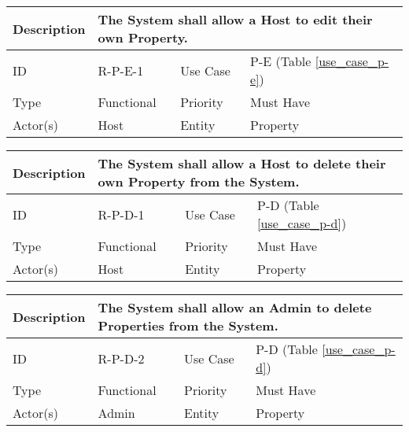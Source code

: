 \begin{tabular}{|p{1.5cm}|p{1.5cm}|p{1.5cm}|p{1.5cm}|p{1.5cm}|p{1.5cm}|p{1.5cm}|p{1.5cm}|p{1.5cm}|p{1.5cm}|p{1.5cm}|p{1.5cm}|}
    \hline
    \multicolumn{2}{|o|}{Description} & \multicolumn{10}{p{12.5cm}|}{The System shall allow a Host to edit their own Property.} \\ \hline
    \multicolumn{2}{|o|}{ID}          & \multicolumn{4}{n}{R-P-E-1}            & \multicolumn{2}{|o|}{Use Case}    & \multicolumn{4}{n|}{P-E (Table \ref{use_case_p-e})} \\ \hline
    \multicolumn{2}{|o|}{Type}        & \multicolumn{4}{n}{Functional}         & \multicolumn{2}{|o|}{Priority}    & \multicolumn{4}{n|}{Must Have}  \\ \hline
    \multicolumn{2}{|o|}{Actor(s)}    & \multicolumn{4}{n}{Host}               & \multicolumn{2}{|o|}{Entity}      & \multicolumn{4}{n|}{Property} \\ \hline
\end{tabular}

\begin{tabular}{|p{1.5cm}|p{1.5cm}|p{1.5cm}|p{1.5cm}|p{1.5cm}|p{1.5cm}|p{1.5cm}|p{1.5cm}|p{1.5cm}|p{1.5cm}|p{1.5cm}|p{1.5cm}|}
    \hline
    \multicolumn{2}{|o|}{Description} & \multicolumn{10}{p{12.5cm}|}{The System shall allow a Host to delete their own Property from the System.} \\ \hline
    \multicolumn{2}{|o|}{ID}          & \multicolumn{4}{n}{R-P-D-1}            & \multicolumn{2}{|o|}{Use Case}    & \multicolumn{4}{n|}{P-D (Table \ref{use_case_p-d})} \\ \hline
    \multicolumn{2}{|o|}{Type}        & \multicolumn{4}{n}{Functional}         & \multicolumn{2}{|o|}{Priority}    & \multicolumn{4}{n|}{Must Have}  \\ \hline
    \multicolumn{2}{|o|}{Actor(s)}    & \multicolumn{4}{n}{Host}               & \multicolumn{2}{|o|}{Entity}      & \multicolumn{4}{n|}{Property} \\ \hline
\end{tabular}

\begin{tabular}{|p{1.5cm}|p{1.5cm}|p{1.5cm}|p{1.5cm}|p{1.5cm}|p{1.5cm}|p{1.5cm}|p{1.5cm}|p{1.5cm}|p{1.5cm}|p{1.5cm}|p{1.5cm}|}
    \hline
    \multicolumn{2}{|o|}{Description} & \multicolumn{10}{p{12.5cm}|}{The System shall allow an Admin to delete Properties from the System.} \\ \hline
    \multicolumn{2}{|o|}{ID}          & \multicolumn{4}{n}{R-P-D-2}            & \multicolumn{2}{|o|}{Use Case}    & \multicolumn{4}{n|}{P-D (Table \ref{use_case_p-d})} \\ \hline
    \multicolumn{2}{|o|}{Type}        & \multicolumn{4}{n}{Functional}         & \multicolumn{2}{|o|}{Priority}    & \multicolumn{4}{n|}{Must Have}  \\ \hline
    \multicolumn{2}{|o|}{Actor(s)}    & \multicolumn{4}{n}{Admin}              & \multicolumn{2}{|o|}{Entity}      & \multicolumn{4}{n|}{Property} \\ \hline
\end{tabular}

